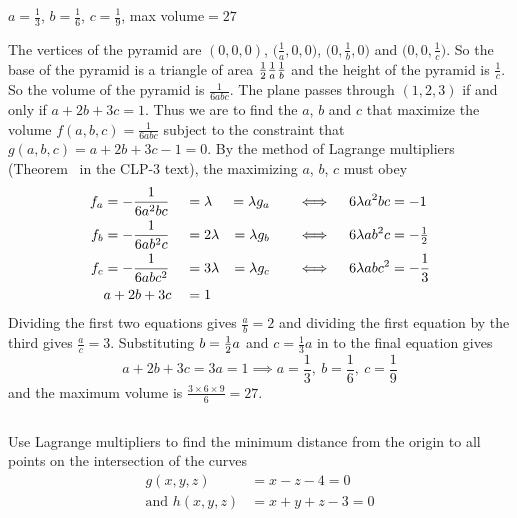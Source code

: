 %

\begin{answer}
$a=\frac{1}{3}$, $b=\frac{1}{6}$, $c=\frac{1}{9}$,
max volume$ = 27$
\end{answer}

\begin{solution}
The vertices of the pyramid are $(0,0,0)$, 
$\big(\frac{1}{a},0,0\big)$, $\big(0, \frac{1}{b},0\big)$ and
$\big(0,0,\frac{1}{c}\big)$. So the base of the pyramid is a triangle
of area $\tfrac{1}{2}\frac{1}{a}\frac{1}{b}$ and the height of the pyramid is
$\frac{1}{c}$. So the volume of the pyramid is $\frac{1}{6abc}$.
The plane passes through $(1,2,3)$ if and only if $a+2b+3c=1$. 
Thus we are to find the $a$, $b$ and $c$ that maximize the volume 
$f(a,b,c)=\frac{1}{6abc}$ subject to the constraint that 
$g(a,b,c)=a+2b+3c-1=0$. 
By the method of Lagrange multipliers (Theorem~ 
in the CLP-3 text), the maximizing $a$, $b$, $c$ must obey
\begin{alignat*}{5}
f_a&=-\frac{1}{6a^2bc}&&=\lambda&=\lambda g_a\quad &&\iff\quad 6\lambda a^2bc&=-1 \\
f_b&=-\frac{1}{6ab^2c}&&=2\lambda&=\lambda g_b\quad&&\iff\quad 6\lambda ab^2c&=-\tfrac{1}{2} \\
f_c&=-\frac{1}{6abc^2}&&=3\lambda&=\lambda g_c\quad      &&\iff\quad 
                                     6\lambda abc^2&=-\frac{1}{3}\\
    &a+2b+3c&&=1
\end{alignat*}
Dividing the first two equations gives $\frac{a}{b}=2$
and dividing the first equation by the third gives $\frac{a}{c}=3$.
Substituting $b=\tfrac{1}{2} a$ and $c=\frac{1}{3} a$ in to the final equation gives
\begin{equation*}
a+2b+3c=3a=1  %
\implies a=\frac{1}{3},\ b=\frac{1}{6},\ c=\frac{1}{9}
\end{equation*}
and the maximum volume is $\frac{3\times 6\times 9}{6}=27$.
\end{solution}

\subsection*{\Application}

\begin{question}[M200 2009D] %
Use Lagrange multipliers to find the minimum distance from the origin 
to all points on the intersection of the curves
\begin{align*}
            g(x,y,z) &= x-z-4=0 \\
\text{and } h(x,y,z) &= x+y+z-3=0
\end{align*}
\end{question}

